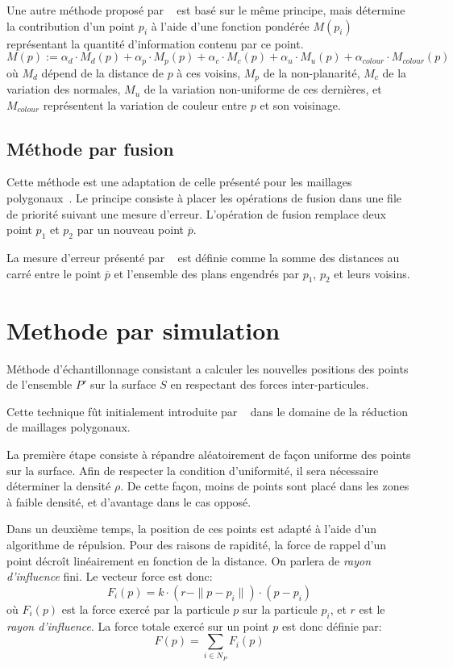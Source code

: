 Une autre méthode proposé par \citeauthor{Linsen2001}~\cite{Linsen2001} est basé sur le même principe, mais détermine la contribution d'un point $p_i$ à l'aide d'une fonction pondérée $M(p_i)$ représentant la quantité d'information contenu par ce point.
$$M(p) := \alpha_d \cdot M_d(p)+\alpha_p \cdot M_p(p)+\alpha_c \cdot M_c(p)+\alpha_u \cdot M_u(p)+\alpha_{colour} \cdot M_{colour}(p)$$
où $M_d$ dépend de la distance de $p$ à ces voisins, $M_p$ de la non-planarité, $M_c$ de la variation des normales, $M_u$ de la variation non-uniforme de ces dernières, et $M_{colour}$ représentent la variation de couleur entre $p$ et son voisinage.

\subsection{Méthode par fusion}
Cette méthode est une adaptation de celle présenté pour les maillages polygonaux~\cite{Hoppe1996}. Le principe consiste à placer les opérations de fusion dans une file de priorité suivant une mesure d'erreur. L'opération de fusion remplace deux point $p_1$ et $p_2$ par un nouveau point $\overline{p}$.

La mesure d'erreur présenté par \citeauthor{Pauly2002}~\cite{Pauly2002} est définie comme la somme des distances au carré entre le point $\overline{p}$ et l'ensemble des plans engendrés par $p_1$, $p_2$ et leurs voisins.

\section{Methode par simulation}
\begin{definition}
  Méthode d'échantillonnage consistant a calculer les nouvelles positions des points de l'ensemble $P'$ sur la surface $S$ en respectant des forces inter-particules.
\end{definition}

Cette technique fût initialement introduite par \citeauthor{Turk1992}~\cite{Turk1992} dans le domaine de la réduction de maillages polygonaux.

La première étape consiste à répandre aléatoirement de façon uniforme des points sur la surface. Afin de respecter la condition d'uniformité, il sera nécessaire déterminer la densité $\rho$. De cette façon, moins de points sont placé dans les zones à faible densité, et d'avantage dans le cas opposé.

Dans un deuxième temps, la position de ces points est adapté à l'aide d'un algorithme de répulsion. Pour des raisons de rapidité, la force de rappel d'un point décroît linéairement en fonction de la distance. On parlera de \emph{rayon d'influence} fini. Le vecteur force est donc:
$$F_i(p)=k\cdot(r-\|p-p_i\|)\cdot(p-p_i)$$
où $F_i(p)$ est la force exercé par la particule $p$ sur la particule $p_i$, et $r$ est le \emph{rayon d'influence}.
La force totale exercé sur un point $p$ est donc définie par:
$$F(p)=\sum\limits_{i\in N_P}F_i(p)$$

